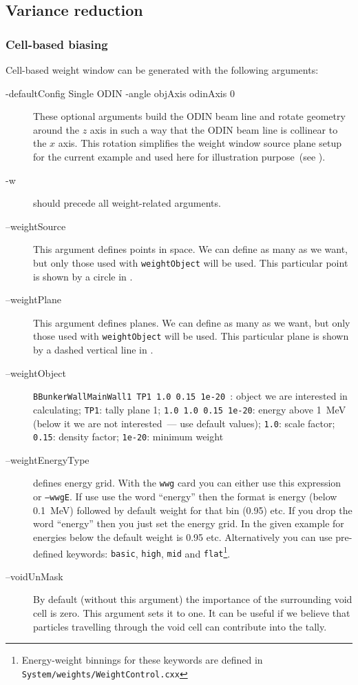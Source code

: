 \subsection{Variance reduction}
\subsubsection{Cell-based biasing}
\label{sec:vr:cell}

Cell-based weight window can be generated with the following arguments:



\begin{description}
\item[-defaultConfig Single ODIN -angle objAxis odinAxis 0] These optional arguments build the ODIN beam line
  and rotate geometry around the $z$ axis in such a way that the ODIN beam line is collinear to the $x$ axis.
  This rotation simplifies the weight window source plane setup for the current example and used here for
  illustration purpose~(see ).
\item[-w] should precede all weight-related arguments.
\item[--weightSource] This argument defines points in space. We can define as many as we want, but only those used with {\tt weightObject} will be used. This particular point is shown by a circle in .
\item[--weightPlane] This argument defines planes. We can define as many as we want, but only those used with {\tt weightObject} will be used. This particular plane is shown by a dashed vertical line in .
\item[--weightObject] {\tt BBunkerWallMainWall1 TP1 1.0 0.15 1e-20 }: object we are interested in calculating; {\tt TP1}: tally plane 1;
  \mbox{\tt 1.0 1.0 0.15 1e-20}: energy above \SI{1}{\mega\electronvolt} (below it we are not interested~--- use default values);
  {\tt 1.0}: scale factor; 
  {\tt 0.15}: density factor; {\tt 1e-20}: minimum weight %
\item[--weightEnergyType] defines energy grid. With the {\tt wwg} card you can either use this expression or {\tt --wwgE}.
  If use use the word ``energy'' then the format is energy (below \SI{0.1}{\mega\electronvolt}) followed by default weight for that bin (0.95) etc.
  If you drop the word ``energy'' then you just set the energy grid.
  In the given example for energies below  the default weight is 0.95 etc.
  Alternatively you can use pre-defined keywords:
  {\tt basic}, {\tt high}, {\tt mid} and {\tt flat}\footnote{Energy-weight binnings for these keywords are defined in \tt{System/weights/WeightControl.cxx}}.
\item[--voidUnMask] By default (without this argument) the importance of the surrounding void cell is zero. This argument sets it to one.
  It can be useful if we believe that particles travelling through the void cell can contribute into the tally.


\end{description}
